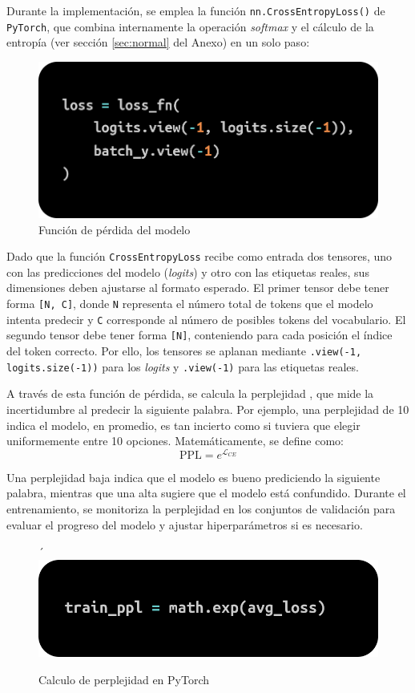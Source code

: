 \documentclass[11pt]{book}
\theoremstyle{plain}
\theoremstyle{definition}
\begin{document}
Durante la implementación, se emplea la función \texttt{nn.CrossEntropyLoss()} de \texttt{PyTorch}, que combina internamente la operación \textit{softmax} y el cálculo de la entropía (ver sección \ref{sec:normal} del Anexo) en un solo paso:

\begin{figure}[h]
    \centering
    \includegraphics[width=0.5\linewidth]{img/cross_entropy.png}
    \caption{Función de pérdida del modelo \parencite{geeksforgeeks_crossentropy}}
    \label{fig:placeholder20}
\end{figure}

Dado que la función \texttt{CrossEntropyLoss} recibe como entrada dos tensores, uno con las predicciones del modelo (\textit{logits}) y otro con las etiquetas reales, sus dimensiones deben ajustarse al formato esperado. El primer tensor debe tener forma \texttt{[N, C]}, donde \texttt{N} representa el número total de tokens que el modelo intenta predecir y \texttt{C} corresponde al número de posibles tokens del vocabulario. El segundo tensor debe tener forma \texttt{[N]}, conteniendo para cada posición el índice del token correcto. Por ello, los tensores se aplanan mediante \texttt{.view(-1, logits.size(-1))} para los \textit{logits} y \texttt{.view(-1)} para las etiquetas reales.

A través de esta función de pérdida, se calcula la perplejidad \parencite{keerthanams2025evaluating}, que mide la incertidumbre al predecir la siguiente palabra. Por ejemplo, una perplejidad de 10 indica el modelo, en promedio, es tan incierto como si tuviera que elegir uniformemente entre 10 opciones. Matemáticamente, se define como:
\[
\text{PPL} = e^{\mathcal{L}_{CE}}
\]

Una perplejidad baja indica que el modelo es bueno prediciendo la siguiente palabra, mientras que una alta sugiere que el modelo está confundido. Durante el entrenamiento, se monitoriza la perplejidad en los conjuntos de validación para evaluar el progreso del modelo y ajustar hiperparámetros si es necesario.

\begin{figure}[h]
    \centering´
    \includegraphics[width=0.5\linewidth]{img/perplexity.png}
    \caption{Calculo de perplejidad en PyTorch \parencite{stackoverflow_perplexity_pytorch}}
    \label{fig:placeholder21}
\end{figure}
\end{document}

